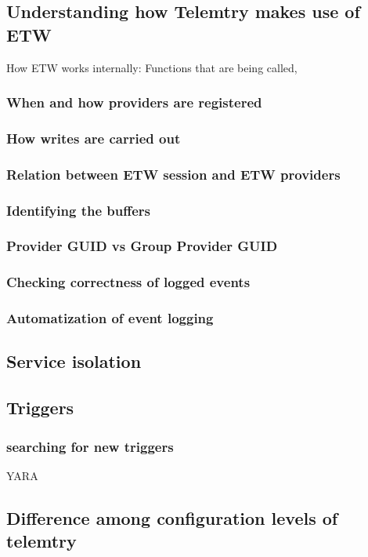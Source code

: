 \documentclass[11pt,a4paper,twoside]{tesis}
\begin{document}
\subsection*{Understanding how Telemtry makes use of ETW}
How ETW works internally: Functions that are being called, 
\subsubsection*{When and how providers are registered}
\subsubsection*{How writes are carried out}
\subsubsection*{Relation between ETW session and ETW providers}
\subsubsection*{Identifying the buffers}
\subsubsection*{Provider GUID vs Group Provider GUID}
\subsubsection*{Checking correctness of logged events}
\subsubsection*{Automatization of event logging}
\subsection*{Service isolation}
\subsection*{Triggers}
\subsubsection*{searching for new triggers} YARA

\subsection*{Difference among configuration levels of telemtry}
\end{document}
